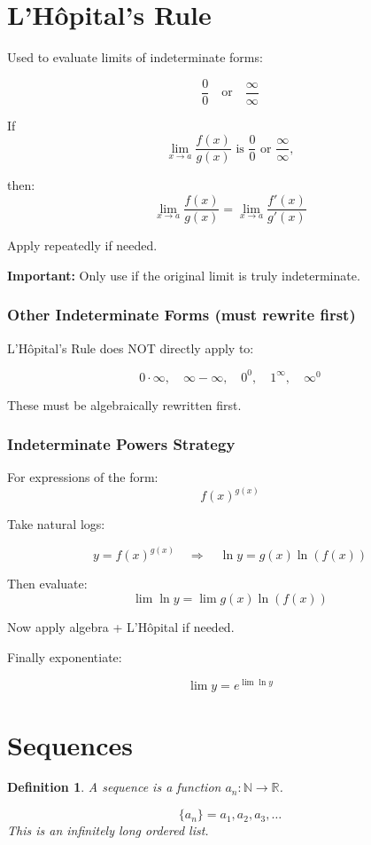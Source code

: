 \documentclass[11pt]{article}
\theoremstyle{mydef}
\newtheorem{definition}{Definition}
\begin{document}
\section*{L'Hôpital's Rule}

Used to evaluate limits of indeterminate forms:

\[
\frac{0}{0} \quad \text{or} \quad \frac{\infty}{\infty}
\]

If
\[
\lim_{x\to a} \frac{f(x)}{g(x)} \text{ is } \frac{0}{0} \text{ or } \frac{\infty}{\infty},
\]

then:
\[
\lim_{x\to a} \frac{f(x)}{g(x)}
=
\lim_{x\to a} \frac{f'(x)}{g'(x)}
\]

Apply repeatedly if needed.

\textbf{Important:} Only use if the original limit is truly indeterminate.

\subsubsection*{Other Indeterminate Forms (must rewrite first)}

L'Hôpital's Rule does NOT directly apply to:

\[
0 \cdot \infty,\quad \infty - \infty,\quad 0^0,\quad 1^\infty,\quad \infty^0
\]

These must be algebraically rewritten first.



\subsubsection*{Indeterminate Powers Strategy}

For expressions of the form:
\[
f(x)^{g(x)}
\]

Take natural logs:

\[
y = f(x)^{g(x)}
\quad \Rightarrow \quad
\ln y = g(x)\ln(f(x))
\]

Then evaluate:
\[
\lim \ln y = \lim g(x)\ln(f(x))
\]

Now apply algebra + L'Hôpital if needed.

Finally exponentiate:

\[
\lim y = e^{\lim \ln y}
\]

\section*{Sequences}

\begin{definition}
A \textit{sequence} is a function $a_n : \mathbb{N} \to \mathbb{R}$.

\[
\{a_n\} = a_1, a_2, a_3, \dots
\]
This is an infinitely long ordered list. 
\end{definition}
\end{document}
